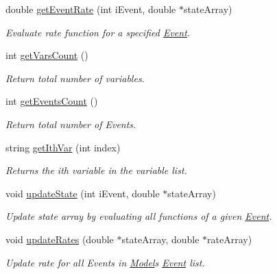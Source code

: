 \begin{DoxyCompactItemize}
double \hyperlink{class_model_a2909caddddccca90faaae708e68226ad}{get\+Event\+Rate} (int i\+Event, double $\ast$state\+Array)
\begin{DoxyCompactList}\small\item\em Evaluate rate function for a specified \hyperlink{class_event}{Event}. \end{DoxyCompactList}\item 
int \hyperlink{class_model_ae8b56a284c355ff18421174d078dc870}{get\+Vars\+Count} ()
\begin{DoxyCompactList}\small\item\em Return total number of variables. \end{DoxyCompactList}\item 
int \hyperlink{class_model_adc48dad5a02caa940aaffee7e8377682}{get\+Events\+Count} ()
\begin{DoxyCompactList}\small\item\em Return total number of Events. \end{DoxyCompactList}\item 
string \hyperlink{class_model_adcb9dcc2d1d58f18d595f1476fc77b3b}{get\+Ith\+Var} (int index)
\begin{DoxyCompactList}\small\item\em Returns the ith variable in the variable list. \end{DoxyCompactList}\item 
void \hyperlink{class_model_ad9e7a181a31a2a9fab052d11b1984afd}{update\+State} (int i\+Event, double $\ast$state\+Array)
\begin{DoxyCompactList}\small\item\em Update state array by evaluating all functions of a given \hyperlink{class_event}{Event}. \end{DoxyCompactList}\item 
void \hyperlink{class_model_a3f2fd71261c87162718864d7efc67f2f}{update\+Rates} (double $\ast$state\+Array, double $\ast$rate\+Array)
\begin{DoxyCompactList}\small\item\em Update rate for all Events in \hyperlink{class_model}{Model}\textquotesingle{}s \hyperlink{class_event}{Event} list. \end{DoxyCompactList}\end{DoxyCompactItemize}
